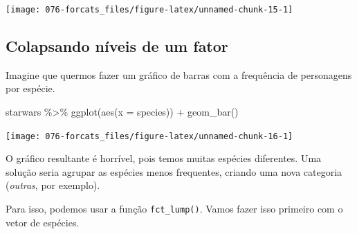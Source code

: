 \documentclass[
]{book}
\newenvironment{Shaded}{\begin{snugshade}}{\end{snugshade}}
\newcommand{\AttributeTok}[1]{\textcolor[rgb]{0.77,0.63,0.00}{#1}}
\newcommand{\FunctionTok}[1]{\textcolor[rgb]{0.00,0.00,0.00}{#1}}
\newcommand{\NormalTok}[1]{#1}
\newcommand{\SpecialCharTok}[1]{\textcolor[rgb]{0.00,0.00,0.00}{#1}}
\begin{document}
\begin{center}\texttt{[image: 076-forcats\_files/figure-latex/unnamed-chunk-15-1]} \end{center}

\hypertarget{colapsando-nuxedveis-de-um-fator}{%
\subsection{Colapsando níveis de um fator}\label{colapsando-nuxedveis-de-um-fator}}

Imagine que quermos fazer um gráfico de barras com a frequência de personagens por espécie.

\begin{Shaded}
\begin{Highlighting}[]
\NormalTok{starwars }\SpecialCharTok{\%\textgreater{}\%} 
  \FunctionTok{ggplot}\NormalTok{(}\FunctionTok{aes}\NormalTok{(}\AttributeTok{x =}\NormalTok{ species)) }\SpecialCharTok{+}
  \FunctionTok{geom\_bar}\NormalTok{()}
\end{Highlighting}
\end{Shaded}

\begin{center}\texttt{[image: 076-forcats\_files/figure-latex/unnamed-chunk-16-1]} \end{center}

O gráfico resultante é horrível, pois temos muitas espécies diferentes. Uma solução seria agrupar as espécies menos frequentes, criando uma nova categoria (\emph{outras}, por exemplo).

Para isso, podemos usar a função \texttt{fct\_lump()}. Vamos fazer isso primeiro com o vetor de espécies.
\end{document}
